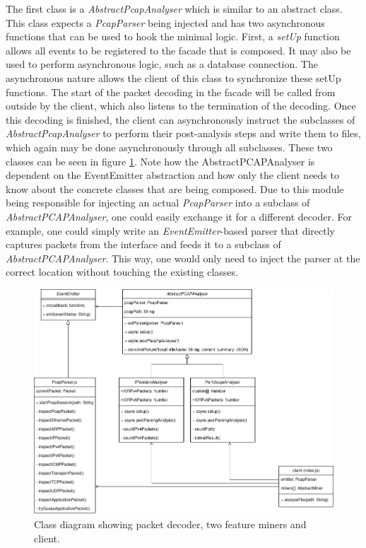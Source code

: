 The first class is a \textit{AbstractPcapAnalyser} which is similar to an abstract class. This class expects a  \textit{PcapParser} being injected and has two asynchronous functions that can be used to hook the minimal logic. First, a \textit{setUp} function allows all events to be registered to the facade that is composed. It may also be used to perform asynchronous logic, such as a database connection. The asynchronous nature allows the client of this class to synchronize these setUp functions.
The start of the packet decoding in the facade will be called from outside by the client, which also listens to the termination of the decoding. Once this decoding is finished, the client can asynchronously instruct the subclasses of \textit{AbstractPcapAnalyser} to perform their post-analysis steps and write them to files, which again may be done asynchronously through all subclasses.
These two classes can be seen in figure \ref{fig:classdiagrambackend}. Note how the AbstractPCAPAnalyser is dependent on the EventEmitter abstraction and how only the client needs to know about the concrete classes that are being composed. Due to this module being responsible for injecting an actual \textit{PcapParser} into a subclass of \textit{AbstractPCAPAnalyser}, one could easily exchange it for a different decoder. For example, one could simply write an \textit{EventEmitter}-based parser that directly captures packets from the interface and feeds it to a subclass of \textit{AbstractPCAPAnalyser}. This way, one would only need to inject the parser at the correct location without touching the existing classes.
\begin{figure}
    \centering
    \includegraphics[width=14cm]{images/backend-miners(2).png}
    \caption{Class diagram showing packet decoder, two feature miners and client.}
    \label{fig:classdiagrambackend}
\end{figure}
